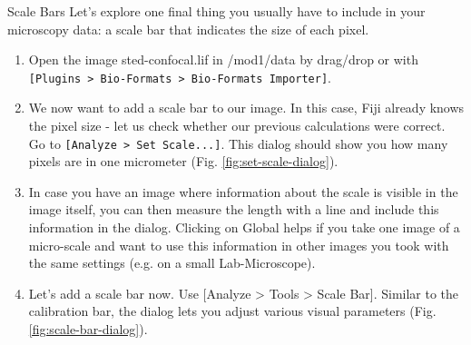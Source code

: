 \begin{taskbox}{Scale Bars}
Let's explore one final thing you usually have to include in your microscopy data: a scale bar that indicates the size of each pixel.

\begin{enumerate}
	\item Open the image sted-confocal.lif in /mod1/data by drag/drop or with \texttt{[Plugins > Bio-Formats > Bio-Formats Importer]}.  
	\item We now want to add a scale bar to our image. In this case, Fiji already knows the pixel size - let us check whether our previous calculations were correct. Go to \texttt{[Analyze > Set Scale...]}. This dialog should show you how many pixels are in one micrometer (Fig. \ref{fig:set-scale-dialog}).
	
	\begin{minipage}[t]{\linewidth}
		\begin{center}
		\medskip
		\label{fig:set-scale-dialog}
		\end{center}
	\end{minipage}
	
	\item In case you have an image where information about the scale is visible in the image itself, you can then measure the length with a line and include this information in the dialog. Clicking on Global helps if you take one image of a micro-scale and want to use this information in other images you took with the same settings (e.g. on a small Lab-Microscope).
	\item Let's add a scale bar now. Use [Analyze > Tools > Scale Bar]. Similar to the calibration bar, the dialog lets you adjust various visual parameters (Fig. \ref{fig:scale-bar-dialog}).
	

\end{enumerate}
\end{taskbox}
